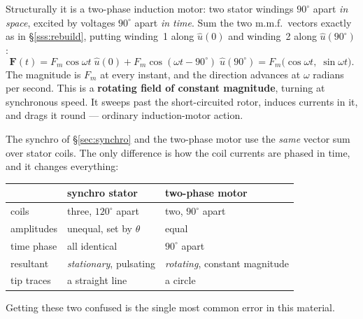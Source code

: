 \documentclass[11pt,a4paper]{article}
\begin{document}
Structurally it is a two-phase induction motor: two stator windings
$90^\circ$ apart \emph{in space}, excited by voltages $90^\circ$ apart \emph{in
time}. Sum the two m.m.f.\ vectors exactly as in \S\ref{sss:rebuild}, putting
winding~1 along $\hat{u}(0)$ and winding~2 along $\hat{u}(90^\circ)$:
\begin{equation}
  \mathbf{F}(t)=F_{m}\cos\omega t\;\hat{u}(0)
              + F_{m}\cos(\omega t-90^\circ)\;\hat{u}(90^\circ)
              = F_{m}\big(\cos\omega t,\;\sin\omega t\big).
  \label{eq:rotfield}
\end{equation}
The magnitude is $F_{m}$ at every instant, and the direction advances at
$\omega$ radians per second. This is a \textbf{rotating field of constant
magnitude}, turning at synchronous speed. It sweeps past the short-circuited
rotor, induces currents in it, and drags it round --- ordinary induction-motor
action.

\begin{keyidea}
The synchro of \S\ref{sec:synchro} and the two-phase motor use the \emph{same}
vector sum over stator coils. The only difference is how the coil currents are
phased in time, and it changes everything:
\begin{center}
\begin{tabular}{lll}
\toprule
 & synchro stator & two-phase motor \\
\midrule
coils          & three, $120^\circ$ apart & two, $90^\circ$ apart \\
amplitudes     & unequal, set by $\theta$ & equal \\
time phase     & all identical            & $90^\circ$ apart \\
resultant      & \emph{stationary}, pulsating & \emph{rotating}, constant magnitude \\
tip traces     & a straight line          & a circle \\
\bottomrule
\end{tabular}
\end{center}
Getting these two confused is the single most common error in this material.
\end{keyidea}
\end{document}
